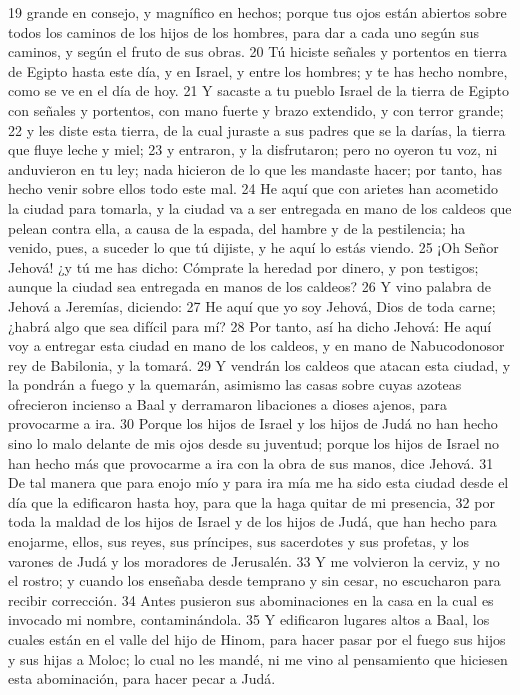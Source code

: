 19 grande en consejo, y magnífico en hechos; porque tus ojos están abiertos sobre todos los caminos de los hijos de los hombres, para dar a cada uno según sus caminos, y según el fruto de sus obras.
20 Tú hiciste señales y portentos en tierra de Egipto hasta este día, y en Israel, y entre los hombres; y te has hecho nombre, como se ve en el día de hoy.
21 Y sacaste a tu pueblo Israel de la tierra de Egipto con señales y portentos, con mano fuerte y brazo extendido, y con terror grande;
22 y les diste esta tierra, de la cual juraste a sus padres que se la darías, la tierra que fluye leche y miel;
23 y entraron, y la disfrutaron; pero no oyeron tu voz, ni anduvieron en tu ley; nada hicieron de lo que les mandaste hacer; por tanto, has hecho venir sobre ellos todo este mal.
24 He aquí que con arietes han acometido la ciudad para tomarla, y la ciudad va a ser entregada en mano de los caldeos que pelean contra ella, a causa de la espada, del hambre y de la pestilencia; ha venido, pues, a suceder lo que tú dijiste, y he aquí lo estás viendo.
25 ¡Oh Señor Jehová! ¿y tú me has dicho: Cómprate la heredad por dinero, y pon testigos; aunque la ciudad sea entregada en manos de los caldeos?
26 Y vino palabra de Jehová a Jeremías, diciendo:
27 He aquí que yo soy Jehová, Dios de toda carne; ¿habrá algo que sea difícil para mí?
28 Por tanto, así ha dicho Jehová: He aquí voy a entregar esta ciudad en mano de los caldeos, y en mano de Nabucodonosor rey de Babilonia, y la tomará. 
29 Y vendrán los caldeos que atacan esta ciudad, y la pondrán a fuego y la quemarán, asimismo las casas sobre cuyas azoteas ofrecieron incienso a Baal y derramaron libaciones a dioses ajenos, para provocarme a ira.
30 Porque los hijos de Israel y los hijos de Judá no han hecho sino lo malo delante de mis ojos desde su juventud; porque los hijos de Israel no han hecho más que provocarme a ira con la obra de sus manos, dice Jehová.
31 De tal manera que para enojo mío y para ira mía me ha sido esta ciudad desde el día que la edificaron hasta hoy, para que la haga quitar de mi presencia,
32 por toda la maldad de los hijos de Israel y de los hijos de Judá, que han hecho para enojarme, ellos, sus reyes, sus príncipes, sus sacerdotes y sus profetas, y los varones de Judá y los moradores de Jerusalén.
33 Y me volvieron la cerviz, y no el rostro; y cuando los enseñaba desde temprano y sin cesar, no escucharon para recibir corrección.
34 Antes pusieron sus abominaciones en la casa en la cual es invocado mi nombre, contaminándola. 
35 Y edificaron lugares altos a Baal, los cuales están en el valle del hijo de Hinom, para hacer pasar por el fuego sus hijos y sus hijas a Moloc; lo cual no les mandé, ni me vino al pensamiento que hiciesen esta abominación, para hacer pecar a Judá.
